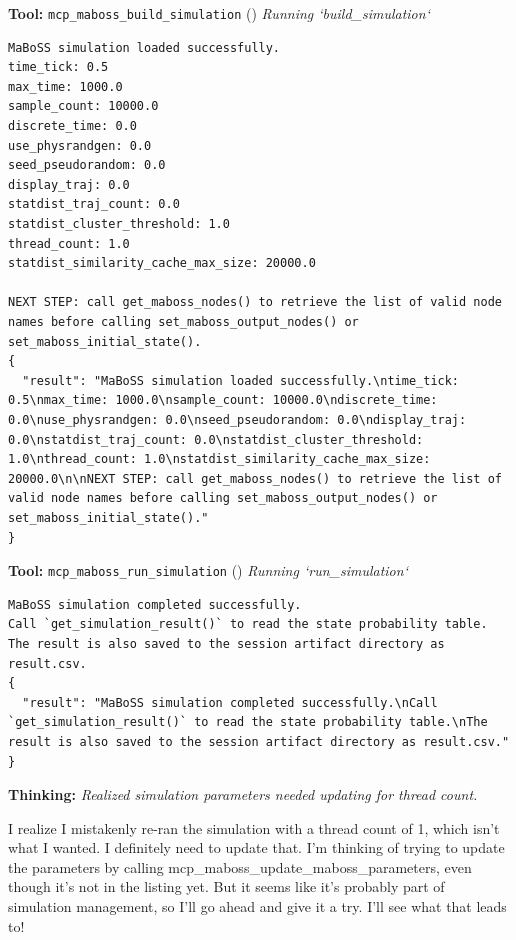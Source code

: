 \documentclass[11pt,a4paper]{article}
\begin{document}
\begin{toolokbox}
\textbf{Tool:} \texttt{mcp\_maboss\_build\_simulation} (\checkmark)
\textit{Running `build\_simulation`}
\begin{lstlisting}
MaBoSS simulation loaded successfully.
time_tick: 0.5
max_time: 1000.0
sample_count: 10000.0
discrete_time: 0.0
use_physrandgen: 0.0
seed_pseudorandom: 0.0
display_traj: 0.0
statdist_traj_count: 0.0
statdist_cluster_threshold: 1.0
thread_count: 1.0
statdist_similarity_cache_max_size: 20000.0

NEXT STEP: call get_maboss_nodes() to retrieve the list of valid node names before calling set_maboss_output_nodes() or set_maboss_initial_state().
{
  "result": "MaBoSS simulation loaded successfully.\ntime_tick: 0.5\nmax_time: 1000.0\nsample_count: 10000.0\ndiscrete_time: 0.0\nuse_physrandgen: 0.0\nseed_pseudorandom: 0.0\ndisplay_traj: 0.0\nstatdist_traj_count: 0.0\nstatdist_cluster_threshold: 1.0\nthread_count: 1.0\nstatdist_similarity_cache_max_size: 20000.0\n\nNEXT STEP: call get_maboss_nodes() to retrieve the list of valid node names before calling set_maboss_output_nodes() or set_maboss_initial_state()."
}
\end{lstlisting}
\end{toolokbox}
\begin{toolokbox}
\textbf{Tool:} \texttt{mcp\_maboss\_run\_simulation} (\checkmark)
\textit{Running `run\_simulation`}
\begin{lstlisting}
MaBoSS simulation completed successfully.
Call `get_simulation_result()` to read the state probability table.
The result is also saved to the session artifact directory as result.csv.
{
  "result": "MaBoSS simulation completed successfully.\nCall `get_simulation_result()` to read the state probability table.\nThe result is also saved to the session artifact directory as result.csv."
}
\end{lstlisting}
\end{toolokbox}
\begin{thinkbox}
\textbf{Thinking:} \textit{Realized simulation parameters needed updating for thread count.}

I realize I mistakenly re-ran the simulation with a thread count of 1, which isn't what I wanted. I definitely need to update that. I'm thinking of trying to update the parameters by calling mcp\_maboss\_update\_maboss\_parameters, even though it's not in the listing yet. But it seems like it's probably part of simulation management, so I'll go ahead and give it a try. I'll see what that leads to!

\end{thinkbox}
\end{document}
